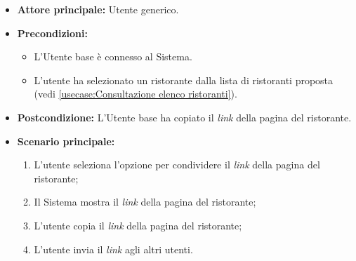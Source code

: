 \label{usecase:Condivisione link del ristorante}
\begin{itemize}
    \item \textbf{Attore principale:} Utente generico.


	\item \textbf{Precondizioni:}
	\begin{itemize}
		\item L'Utente base è connesso al Sistema.
		\item L'utente ha selezionato un ristorante dalla lista di ristoranti proposta (vedi \autoref{usecase:Consultazione elenco ristoranti}).
	\end{itemize}

	\item \textbf{Postcondizione:}
	      L'Utente base ha copiato il \textit{link} della pagina del ristorante.

	\item \textbf{Scenario principale:}
	      \begin{enumerate}
		      \item L'utente seleziona l'opzione per condividere il \textit{link} della pagina del ristorante;
		      \item Il Sistema mostra il \textit{link} della pagina del ristorante;
		      \item L'utente copia il \textit{link} della pagina del ristorante;
		      \item L'utente invia il \textit{link} agli altri utenti.
	      \end{enumerate}
\end{itemize}